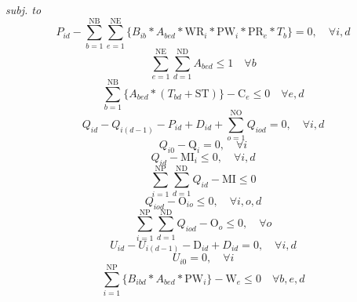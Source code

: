 \emph{subj. to}
\begin{equation}
	P_{id} - \sum_{b=1}^{\mathrm{NB}}{\sum_{e=1}^{\mathrm{NE}}\{B_{ib}*A_{bed}*\mathrm{WR}_i*\mathrm{PW}_i*\mathrm{PR}_e*T_{b}}\}  = 0, \quad \forall{i, d}
	\label{eq:prodQt}
\end{equation}
\begin{equation}
	\sum_{e=1}^{\mathrm{NE}}{\sum_{d=1}^{\mathrm{ND}}{A_{bed}}} \leq 1 \quad \forall{b}
	\label{eq:batchRest}
\end{equation}
\begin{equation}
	\sum_{b=1}^{\mathrm{NB}}\{A_{bed}*(T_{bd}+\mathrm{ST})\} - \mathrm{C}_e \leq 0 \quad \forall{e, d}
	\label{eq:timeRest}
\end{equation}
\begin{equation}
	Q_{id} - Q_{i(d-1)} - P_{id} + D_{id} + \sum_{o=1}^{\mathrm{NO}}{Q_{iod}} = 0 , \quad \forall{i, d}
	\label{eq:demSat}
\end{equation}
\begin{equation}
	Q_{i0} - \mathrm{Q}_i = 0, \quad \forall{i}
	\label{eq:demSatBC}
\end{equation}
\begin{equation}
	Q_{id} - \mathrm{MI}_i \leq 0, \quad \forall{i, d}
	\label{eq:invResByProd}
\end{equation}
\begin{equation}
	\sum_{i=1}^{\mathrm{NP}}{\sum_{d=1}^{\mathrm{ND}}{Q_{id}}} - \mathrm{MI} \leq 0
	\label{eq:invRes}
\end{equation}
\begin{equation}
	Q_{iod} - \mathrm{O}_{io} \leq 0, \quad \forall{i, o, d}
	\label{eq:outInvResByProd}
\end{equation}
\begin{equation}
	\sum_{i=1}^{\mathrm{NP}}{\sum_{d=1}^{\mathrm{ND}}{Q_{iod}}} - \mathrm{O}_o \leq 0, \quad \forall{o}
	\label{eq:outInvRes}
\end{equation}
\begin{equation}
	U_{id} - U_{i(d-1)} - \mathrm{D}_{id} + D_{id} = 0, \quad \forall{i, d}
	\label{eq:unmetDem}
\end{equation}
\begin{equation}
	U_{i0}  = 0, \quad \forall{i}
	\label{eq:unmetDemBC}
\end{equation}
\begin{equation}
	\sum_{i=1}^{\mathrm{NP}}\{B_{ibd}*A_{bed}*\mathrm{PW}_i\} - \mathrm{W}_e \leq 0 \quad \forall{b, e, d}
	\label{eq:widthCap}
\end{equation}
